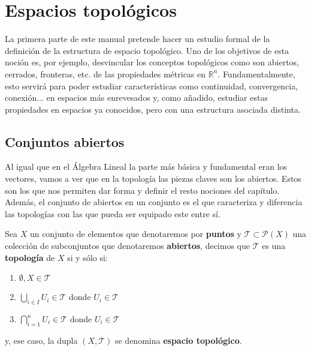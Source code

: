 \chapter{Espacios topológicos}
\label{cha:espacios_topologicos}
La primera parte de este manual pretende hacer un estudio formal de la definición de la estructura de espacio topológico. Uno de los objetivos de esta noción es, por ejemplo, desvincular los conceptos topológicos como son abiertos, cerrados, fronteras, etc. de las propiedades métricas en $\mathbb{R}^n$. Fundamentalmente, esto servirá para poder estudiar características como continuidad, convergencia, conexión... en espacios más enrevesados y, como añadido, estudiar estas propiedades en espacios ya conocidos, pero con una estructura asociada distinta.

\section{Conjuntos abiertos}
\label{sec:conjuntos_abiertos}
Al igual que en el Álgebra Lineal la parte más básica y fundamental eran los vectores, vamos a ver que en la topología las piezas claves son los abiertos. Estos son los que nos permiten dar forma y definir el resto nociones del capítulo. Además, el conjunto de abiertos en un conjunto es el que caracteriza y diferencia las topologías con las que pueda ser equipado este entre sí.

\begin{defi}
Sea $X$ un conjunto de elementos que denotaremos por \textbf{puntos} y $\mathcal{T} \subset \mathcal{P}\left( X \right)$ una colección de subconjuntos que denotaremos \textbf{abiertos}, decimos que $\mathcal{T}$ es una \textbf{topología} de $X$ si y sólo si:
\begin{enumerate}
    \item $\emptyset, X \in \mathcal{T}$ 
    \item $\bigcup_{i \in I} U_i \in \mathcal{T}$ donde $U_i \in \mathcal{T}$
    \item $\bigcap_{i=1}^n U_i \in \mathcal{T}$ donde $U_i \in \mathcal{T}$
\end{enumerate}
y, ese caso, la dupla $\left( X, \mathcal{T} \right)$ se denomina \textbf{espacio topológico}.
\end{defi}

